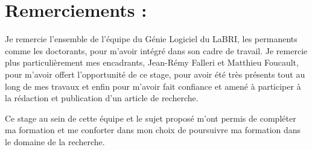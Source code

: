 \section*{Remerciements :}
\label{sec:remerciements}

Je remercie l'ensemble de l'équipe du Génie Logiciel du LaBRI, les permanents comme les doctorants, pour m'avoir intégré dans son cadre de travail. Je remercie plus particulièrement mes encadrants, Jean-Rémy Falleri et Matthieu Foucault, pour m'avoir offert l'opportunité de ce stage, pour avoir été très présents tout au long de  mes travaux et enfin pour m'avoir fait confiance et amené à participer à la rédaction et publication d'un article de recherche.

Ce stage au sein de cette équipe et le sujet proposé m’ont permis de compléter ma formation et me conforter dans mon choix de poursuivre ma formation dans le domaine de la recherche.
